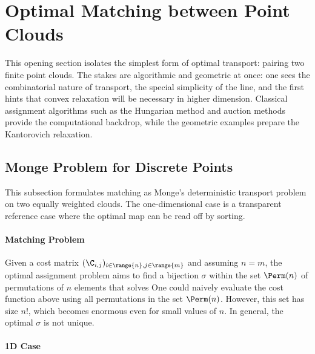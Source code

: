 
\section{Optimal Matching between Point Clouds}
\label{sec-matching}

This opening section isolates the simplest form of optimal transport: pairing two finite point clouds. The stakes are algorithmic and geometric at once: one sees the combinatorial nature of transport, the special simplicity of the line, and the first hints that convex relaxation will be necessary in higher dimension. Classical assignment algorithms such as the Hungarian method and auction methods~\cite{Kuhn1955,bertsekas1992auction} provide the computational backdrop, while the geometric examples prepare the Kantorovich relaxation.

\subsection{Monge Problem for Discrete Points}
\label{sec-monge-pbm}

This subsection formulates matching as Monge's deterministic transport problem on two equally weighted clouds. The one-dimensional case is a transparent reference case where the optimal map can be read off by sorting.

\paragraph{Matching Problem}


Given a cost matrix $(\C_{i,j})_{i \in \range{n}, j \in \range{m}}$ and assuming $n=m$, the optimal assignment problem aims to find a bijection $\sigma$ within the set $\Perm(n)$ of permutations of $n$ elements that solves
One could naively evaluate the cost function above using all permutations in the set $\Perm(n)$. However, this set has size $n!$, which becomes enormous even for small values of $n$.
%
In general, the optimal $\sigma$ is not unique.

\paragraph{1D Case}

